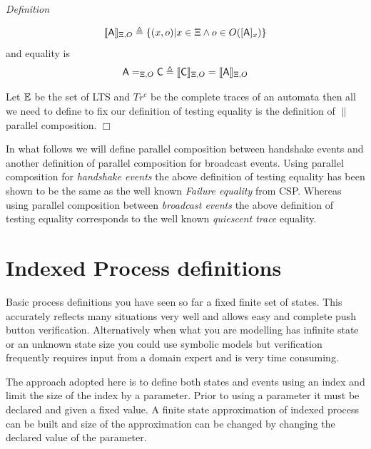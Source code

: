 \documentclass[]{article}
\begin{document}
\emph{Definition} 

\[
 \llbracket {\sf A}\rrbracket_{\Xi,O} \triangleq  \{(x,o) | x \in \Xi \wedge  o\in O([{\sf  A}]_x)\}
\]
and equality is
\[
{\sf A} =_{\Xi, O} {\sf  C} \triangleq   \llbracket {\sf C}\rrbracket_{\Xi,O} = \llbracket {\sf A}\rrbracket_{\Xi,O}
\]

Let $\mathbb E$ be the set of LTS and $Tr^c$ be the complete traces of an automata  then all we need to define to fix our definition of testing equality is the definition of $\parallel$ parallel composition.
\hspace{\fill}$\Box$ 

In what follows we will define parallel composition between handshake events  and  another definition of parallel composition for broadcast events.  Using parallel composition for \emph{handshake events} the above definition of testing equality has been shown to be the same as the well known \emph{Failure equality} from CSP.  Whereas using parallel composition between \emph{broadcast events} the above definition of testing equality corresponds to the well known \emph{quiescent trace} equality.


\section{Indexed Process definitions}


Basic process definitions you have seen so far a fixed finite set of states. This accurately reflects  many situations very well and allows easy and complete push button verification. Alternatively when what you are modelling has infinite state or an unknown state size you could use symbolic models but verification  frequently requires  input from a domain expert and is very time consuming. 

The approach adopted here is to define both states and events using an index and limit the size of the index by a parameter.  Prior to using a parameter it must be declared and given a fixed value. A finite state approximation of indexed process can be built and size of the approximation can be changed by changing the declared value of the parameter. 
\end{document}
